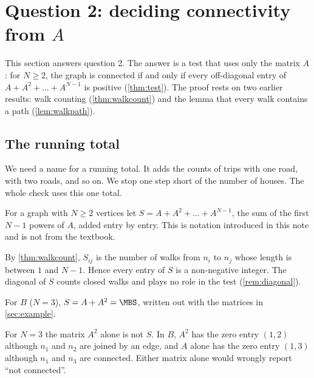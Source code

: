 \section{Question 2: deciding connectivity from $A$}\label{sec:connectivity}

This section answers question 2.
The answer is a test that uses only the matrix $A$: for $N\ge 2$, the graph is connected if and only if every off-diagonal entry of $A+A^2+\dots+A^{N-1}$ is positive (\cref{thm:test}).
The proof rests on two earlier results: walk counting (\cref{thm:walkcount}) and the lemma that every walk contains a path (\cref{lem:walkpath}).

\subsection{The running total}\label{sec:sums}

\plainwords We need a name for a running total.
It adds the counts of trips with one road, with two roads, and so on.
We stop one step short of the number of houses.
The whole check uses this one total.

\begin{definition}\label{def:S}
For a graph with $N\ge 2$ vertices let $S=A+A^2+\dots+A^{N-1}$, the sum of the first $N-1$ powers of $A$, added entry by entry.
This is notation introduced in this note and is not from the textbook.
\end{definition}

\begin{remark}\label{rem:S}
By \cref{thm:walkcount}, $S_{ij}$ is the number of walks from $n_i$ to $n_j$ whose length is between $1$ and $N-1$.
Hence every entry of $S$ is a non-negative integer.
The diagonal of $S$ counts closed walks and plays no role in the test (\cref{rem:diagonal}).
\end{remark}

\begin{example}
For $B$ ($N=3$), $S=A+A^2=\MBS$, written out with the matrices in \cref{sec:example}.
\end{example}

\begin{nonexample}
For $N=3$ the matrix $A^2$ alone is not $S$.
In $B$, $A^2$ has the zero entry $(1,2)$ although $n_1$ and $n_2$ are joined by an edge, and $A$ alone has the zero entry $(1,3)$ although $n_1$ and $n_3$ are connected.
Either matrix alone would wrongly report ``not connected''.
\end{nonexample}

